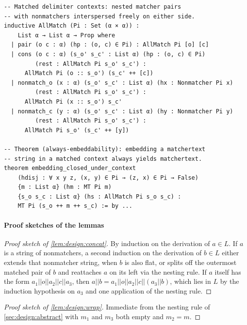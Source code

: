 \begin{lstlisting}
-- Matched delimiter contexts: nested matcher pairs
-- with nonmatchers interspersed freely on either side.
inductive AllMatch (Pi : Set (α × α)) :
    List α → List α → Prop where
  | pair (o c : α) (hp : (o, c) ∈ Pi) : AllMatch Pi [o] [c]
  | cons (o c : α) (s_o' s_c' : List α) (hp : (o, c) ∈ Pi)
         (rest : AllMatch Pi s_o' s_c') :
      AllMatch Pi (o :: s_o') (s_c' ++ [c])
  | nonmatch_o (x : α) (s_o' s_c' : List α) (hx : Nonmatcher Pi x)
         (rest : AllMatch Pi s_o' s_c') :
      AllMatch Pi (x :: s_o') s_c'
  | nonmatch_c (y : α) (s_o' s_c' : List α) (hy : Nonmatcher Pi y)
         (rest : AllMatch Pi s_o' s_c') :
      AllMatch Pi s_o' (s_c' ++ [y])

-- Theorem (always-embeddability): embedding a matchertext
-- string in a matched context always yields matchertext.
theorem embedding_closed_under_context
    (hdisj : ∀ x y z, (x, y) ∈ Pi → (z, x) ∈ Pi → False)
    {m : List α} (hm : MT Pi m)
    {s_o s_c : List α} (hs : AllMatch Pi s_o s_c) :
    MT Pi (s_o ++ m ++ s_c) := by ...
\end{lstlisting}

\paragraph{Proof sketches of the lemmas}

\begin{proof}[Proof sketch of \cref{lem:design:concat}]
By induction on the derivation of $a \in L$.
If $a$ is a string of nonmatchers,
a second induction on the derivation of $b \in L$
either extends that nonmatcher string, when $b$ is also flat,
or splits off the outermost matched pair of $b$
and reattaches $a$ on its left via the nesting rule.
If $a$ itself has the form $a_1||o||a_2||c||a_3$,
then $a||b = a_1||o||a_2||c||(a_3||b)$,
which lies in $L$ by the induction hypothesis on $a_3$
and one application of the nesting rule.
\end{proof}

\begin{proof}[Proof sketch of \cref{lem:design:wrap}]
Immediate from the nesting rule of \cref{sec:design:abstract}
with $m_1$ and $m_3$ both empty and $m_2 = m$.
\end{proof}
